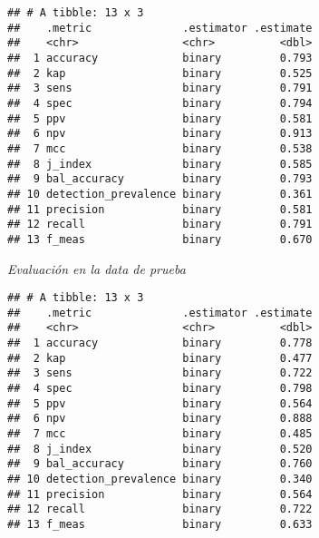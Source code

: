 \documentclass[
]{article}
\newenvironment{Shaded}{\begin{snugshade}}{\end{snugshade}}
\newcommand{\AttributeTok}[1]{\textcolor[rgb]{0.13,0.29,0.53}{#1}}
\newcommand{\FunctionTok}[1]{\textcolor[rgb]{0.13,0.29,0.53}{\textbf{#1}}}
\newcommand{\NormalTok}[1]{#1}
\newcommand{\SpecialCharTok}[1]{\textcolor[rgb]{0.81,0.36,0.00}{\textbf{#1}}}
\begin{document}
\begin{verbatim}
## # A tibble: 13 x 3
##    .metric              .estimator .estimate
##    <chr>                <chr>          <dbl>
##  1 accuracy             binary         0.793
##  2 kap                  binary         0.525
##  3 sens                 binary         0.791
##  4 spec                 binary         0.794
##  5 ppv                  binary         0.581
##  6 npv                  binary         0.913
##  7 mcc                  binary         0.538
##  8 j_index              binary         0.585
##  9 bal_accuracy         binary         0.793
## 10 detection_prevalence binary         0.361
## 11 precision            binary         0.581
## 12 recall               binary         0.791
## 13 f_meas               binary         0.670
\end{verbatim}

\emph{Evaluación en la data de prueba}

\begin{Shaded}
\end{Shaded}

\begin{verbatim}
## # A tibble: 13 x 3
##    .metric              .estimator .estimate
##    <chr>                <chr>          <dbl>
##  1 accuracy             binary         0.778
##  2 kap                  binary         0.477
##  3 sens                 binary         0.722
##  4 spec                 binary         0.798
##  5 ppv                  binary         0.564
##  6 npv                  binary         0.888
##  7 mcc                  binary         0.485
##  8 j_index              binary         0.520
##  9 bal_accuracy         binary         0.760
## 10 detection_prevalence binary         0.340
## 11 precision            binary         0.564
## 12 recall               binary         0.722
## 13 f_meas               binary         0.633
\end{verbatim}
\end{document}
